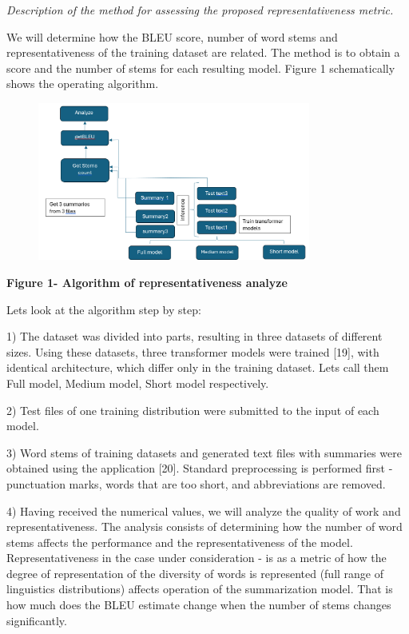 \emph{Description of the method for assessing the proposed
representativeness metric.}

We will determine how the BLEU score, number of word stems and
representativeness of the training dataset are related. The method is to
obtain a score and the number of stems for each resulting model. Figure
1 schematically shows the operating algorithm.

\begin{figure}[H]
	\centering
	\includegraphics[width=0.8\textwidth]{assets/55}
	\caption*{}
\end{figure}

\textbf{Figure 1- Algorithm of representativeness analyze}

Let\textquotesingle s look at the algorithm step by step:

1) The dataset was divided into parts, resulting in three datasets of
different sizes. Using these datasets, three transformer models were
trained {[}19{]}, with identical architecture, which differ only in the
training dataset. Let\textquotesingle s call them Full model, Medium
model, Short model respectively.

2) Test files of one training distribution were submitted to the input
of each model.

3) Word stems of training datasets and generated text files with
summaries were obtained using the application {[}20{]}. Standard
preprocessing is performed first - punctuation marks, words that are too
short, and abbreviations are removed.

4) Having received the numerical values, we will analyze the quality of
work and representativeness. The analysis consists of determining how
the number of word stems affects the performance and the
representativeness of the model. Representativeness in the case under
consideration - is as a metric of how the degree of representation of
the diversity of words is represented (full range of linguistics
distributions) affects operation of the summarization model. That is how
much does the BLEU estimate change when the number of stems changes
significantly.

